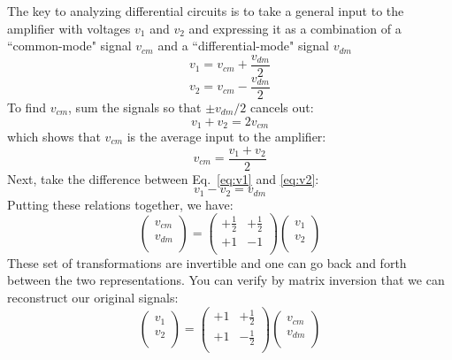 The key to analyzing differential circuits is to take a general input to the amplifier with voltages $v_1$ and $v_2$ and expressing it as a combination of a ``common-mode" signal $v_{cm}$ and a ``differential-mode" signal $v_{dm}$
\begin{equation}
	v_1 = v_{cm} + \frac{v_{dm}}{2}
	\label{eq:v1}
\end{equation}
\begin{equation}
	v_2 = v_{cm} - \frac{v_{dm}}{2}
	\label{eq:v2}
\end{equation}
To find $v_{cm}$, sum the signals so that $\pm v_{dm}/2$ cancels out:
\begin{equation}
	v_1 + v_2 = 2 v_{cm}
\end{equation}
which shows that $v_{cm}$ is the average input to the amplifier:
\begin{equation}
	v_{cm} = \frac{v_1 + v_2}{2}
\end{equation}
Next, take the difference between Eq.~\ref{eq:v1} and \ref{eq:v2}:
\begin{equation}
	v_1 - v_2 = v_{dm} 
\end{equation}
Putting these relations together, we have:
\begin{equation}
	\begin{pmatrix}
		v_{cm} \\
		v_{dm} \\
	\end{pmatrix} =
	\begin{pmatrix}
		+\frac{1}{2} & +\frac{1}{2} \\
		+1 & -1  \\
	\end{pmatrix} 
	\begin{pmatrix}
		v_{1} \\
		v_{2} \\
	\end{pmatrix} 
\end{equation}  
These set of transformations are invertible and one can go back and forth between the two representations.  You can verify by matrix inversion that we can reconstruct our original signals:
\begin{equation}
	\begin{pmatrix}
		v_{1} \\
		v_{2} \\
	\end{pmatrix} =
	\begin{pmatrix}
		+1 & +\frac{1}{2} \\
		+1 & -\frac{1}{2}  \\
	\end{pmatrix} 
	\begin{pmatrix}
		v_{cm} \\
		v_{dm} \\
	\end{pmatrix} 
\end{equation}  
